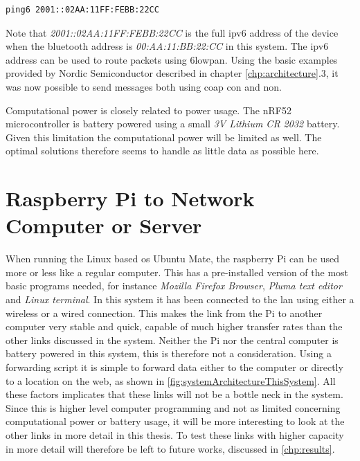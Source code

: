 \begin{verbatim}
ping6 2001::02AA:11FF:FEBB:22CC
\end{verbatim}


\noindent Note that \textit{2001::02AA:11FF:FEBB:22CC} is the full \gls{ipv6} address of the device when the bluetooth address is \textit{00:AA:11:BB:22:CC} in this system. The \gls{ipv6} address can be used to route packets using \gls{6lowpan}. Using the basic examples provided by Nordic Semiconductor described in chapter \ref{chp:architecture}.3, it was now possible to send messages both using \gls{coap} \gls{con} and \gls{non}.  

\noindent Computational power is closely related to power usage. The nRF52 microcontroller is battery powered using a small \textit{3V Lithium CR 2032} battery. Given this limitation the computational power will be limited as well. The optimal solutions therefore seems to handle as little data as possible here. 

\section{Raspberry Pi to Network Computer or Server} 

\noindent When running the Linux based \gls{os} Ubuntu Mate, the raspberry Pi can be used more or less like a regular computer. This has a pre-installed version of the most basic programs needed, for instance \textit{Mozilla Firefox Browser}, \textit{Pluma text editor} and \textit{Linux terminal}. In this system it has been connected to the \gls{lan} using either a wireless or a wired connection. This makes the link from the Pi to another computer very stable and quick, capable of much higher transfer rates than the other links discussed in the system. Neither the Pi nor the central computer is battery powered in this system, this is therefore not a consideration. Using a forwarding script it is simple to forward data either to the computer or directly to a location on the web, as shown in \ref{fig:systemArchitectureThisSystem}. All these factors implicates that these links will not be a bottle neck in the system. Since this is higher level computer programming and not as limited concerning computational power or battery usage, it will be more interesting to look at the other links in more detail in this thesis. To test these links with higher capacity in more detail will therefore be left to future works, discussed in \ref{chp:results}. 

\newpage

